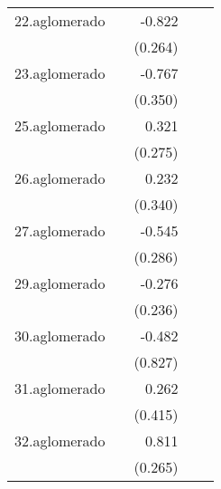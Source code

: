 {\begin{longtable}{l*{4}{D{.}{.}{-1}}}
\addlinespace
22.aglomerado&                     &      -0.822\sym{**} &                     &                     \\
            &                     &     (0.264)         &                     &                     \\
\addlinespace
23.aglomerado&                     &      -0.767\sym{*}  &                     &                     \\
            &                     &     (0.350)         &                     &                     \\
\addlinespace
25.aglomerado&                     &       0.321         &                     &                     \\
            &                     &     (0.275)         &                     &                     \\
\addlinespace
26.aglomerado&                     &       0.232         &                     &                     \\
            &                     &     (0.340)         &                     &                     \\
\addlinespace
27.aglomerado&                     &      -0.545         &                     &                     \\
            &                     &     (0.286)         &                     &                     \\
\addlinespace
29.aglomerado&                     &      -0.276         &                     &                     \\
            &                     &     (0.236)         &                     &                     \\
\addlinespace
30.aglomerado&                     &      -0.482         &                     &                     \\
            &                     &     (0.827)         &                     &                     \\
\addlinespace
31.aglomerado&                     &       0.262         &                     &                     \\
            &                     &     (0.415)         &                     &                     \\
\addlinespace
32.aglomerado&                     &       0.811\sym{**} &                     &                     \\
            &                     &     (0.265)         &                     &                     \\

\end{longtable}}
